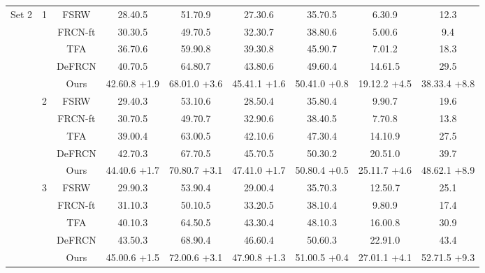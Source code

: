 \documentclass{article}
\begin{document}
\begin{table}[hbt!]
\begin{adjustbox}{width=0.79\textwidth}
{\begin{tabular}{c|c|c|ccc|c|cc}
         \midrule
         \multirow{25}{*}{ Set 2}&\multirow{5}{*}{1}&FSRW \cite{metayolo} &28.40.5&51.70.9&27.30.6&35.70.5&6.30.9&12.3\\
         &&FRCN-ft \cite{metarcnn} &30.30.5&49.70.5&32.30.7&38.80.6&5.00.6&9.4\\
         &&TFA \cite{tfa}&36.70.6&59.90.8&39.30.8&45.90.7&7.01.2&18.3\\
         &&DeFRCN \cite{defrcn}&40.70.5&64.80.7&43.80.6&49.60.4&14.61.5&29.5\\
         && \cellcolor{gray!30}Ours&\cellcolor{gray!30}42.60.8 {\scriptsize \color{red}+1.9}&\cellcolor{gray!30}68.01.0 {\scriptsize \color{red}+3.6}&\cellcolor{gray!30}45.41.1 {\scriptsize \color{red}+1.6}&\cellcolor{gray!30}50.41.0 {\scriptsize \color{red}+0.8}&\cellcolor{gray!30}19.12.2 {\scriptsize \color{red}+4.5}&\cellcolor{gray!30}38.33.4 {\scriptsize \color{red}+8.8}\\
         \cmidrule{2-9}
         &\multirow{5}{*}{2}&FSRW \cite{metayolo} & 29.40.3&53.10.6&28.50.4&35.80.4&9.90.7&19.6  \\
         &&FRCN-ft \cite{metarcnn}&30.70.5&49.70.7&32.90.6&38.40.5&7.70.8&13.8\\
         &&TFA \cite{tfa}&39.00.4&63.00.5&42.10.6&47.30.4&14.10.9&27.5\\
         &&DeFRCN \cite{defrcn}&42.70.3&67.70.5&45.70.5&50.30.2&20.51.0&39.7\\
         && \cellcolor{gray!30}Ours&\cellcolor{gray!30}44.40.6 {\scriptsize \color{red}+1.7}&\cellcolor{gray!30}70.80.7 {\scriptsize \color{red}+3.1}&\cellcolor{gray!30}47.41.0 {\scriptsize \color{red}+1.7}&\cellcolor{gray!30}50.80.4 {\scriptsize \color{red}+0.5}&\cellcolor{gray!30}25.11.7 {\scriptsize \color{red}+4.6}&\cellcolor{gray!30}48.62.1 {\scriptsize \color{red}+8.9}\\
         \cmidrule{2-9}
         &\multirow{5}{*}{3}&FSRW \cite{metayolo} &29.90.3&53.90.4&29.00.4&35.70.3&12.50.7&25.1  \\
         &&FRCN-ft \cite{metarcnn}&31.10.3&50.10.5&33.20.5&38.10.4&9.80.9&17.4\\
         &&TFA \cite{tfa}&40.10.3&64.50.5&43.30.4&48.10.3&16.00.8&30.9\\
         &&DeFRCN \cite{defrcn}&43.50.3&68.90.4&46.60.4&50.60.3&22.91.0&43.4\\
         && \cellcolor{gray!30}Ours&\cellcolor{gray!30}45.00.6 {\scriptsize \color{red}+1.5}&\cellcolor{gray!30}72.00.6 {\scriptsize \color{red}+3.1}&\cellcolor{gray!30}47.90.8 {\scriptsize \color{red}+1.3}&\cellcolor{gray!30}51.00.5 {\scriptsize \color{red}+0.4}&\cellcolor{gray!30}27.01.1 {\scriptsize \color{red}+4.1}&\cellcolor{gray!30}52.71.5 {\scriptsize \color{red}+9.3}\\

\end{tabular}}
\end{adjustbox}
\end{table}
\end{document}
